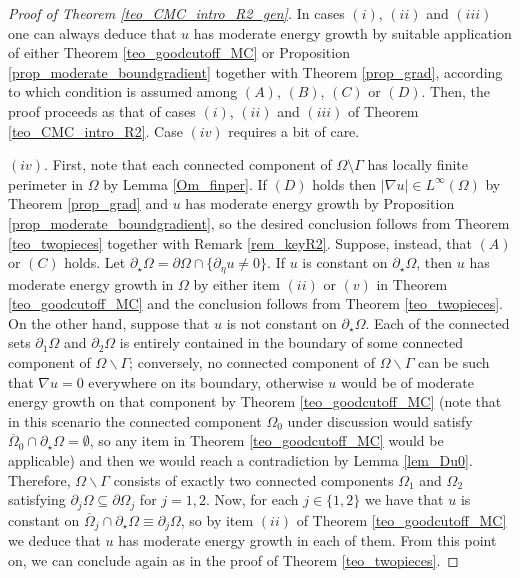 \documentclass[10 pt,a4paper]{article}
\theoremstyle{definition}
\begin{document}
\begin{proof}[Proof of Theorem \ref{teo_CMC_intro_R2_gen}]
	In cases $(i)$, $(ii)$ and $(iii)$ one can always deduce that $u$ has moderate energy growth by suitable application of either Theorem \ref{teo_goodcutoff_MC} or Proposition \ref{prop_moderate_boundgradient} together with Theorem \ref{prop_grad}, according to which condition is assumed among $(A)$, $(B)$, $(C)$ or $(D)$. Then, the proof proceeds as that of cases $(i)$, $(ii)$ and $(iii)$ of Theorem \ref{teo_CMC_intro_R2}. Case $(iv)$ requires a bit of care.
	
	$(iv)$. First, note that each connected component of $\Omega\setminus\Gamma$ has locally finite perimeter in $\Omega$ by Lemma \ref{Om_finper}. If $(D)$ holds then $|\nabla u|\in L^\infty(\Omega)$ by Theorem \eqref{prop_grad} and $u$ has moderate energy growth by Proposition \ref{prop_moderate_boundgradient}, so the desired conclusion follows from Theorem \ref{teo_twopieces} together with Remark \ref{rem_keyR2}. Suppose, instead, that $(A)$ or $(C)$ holds. Let $\partial_\star \Omega = \partial\Omega \cap \{\partial_\eta u \neq 0\}$. If $u$ is constant on $\partial_\star\Omega$, then $u$ has moderate energy growth in $\Omega$ by either item $(ii)$ or $(v)$ in Theorem \ref{teo_goodcutoff_MC} and the conclusion follows from Theorem \ref{teo_twopieces}. On the other hand, suppose that $u$ is not constant on $\partial_\star \Omega$. Each of the connected sets $\partial_1\Omega$ and $\partial_2\Omega$ is entirely contained in the boundary of some connected component of $\Omega\backslash\Gamma$; conversely, no connected component of $\Omega\backslash\Gamma$ can be such that $\nabla u = 0$ everywhere on its boundary, otherwise $u$ would be of moderate energy growth on that component by Theorem \ref{teo_goodcutoff_MC} (note that in this scenario the connected component $\Omega_0$ under discussion would satisfy $\overline{\Omega}_0 \cap \partial_\star\Omega = \emptyset$, so any item in Theorem \ref{teo_goodcutoff_MC} would be applicable) and then we would reach a contradiction by Lemma \ref{lem_Du0}. Therefore, $\Omega\backslash\Gamma$ consists of exactly two connected components $\Omega_1$ and $\Omega_2$ satisfying $\partial_j\Omega \subseteq \partial\Omega_j$ for $j=1,2$. Now, for each $j\in\{1,2\}$ we have that $u$ is constant on $\overline{\Omega}_j \cap \partial_\star\Omega \equiv \partial_j\Omega$, so by item $(ii)$ of Theorem \ref{teo_goodcutoff_MC} we deduce that $u$ has moderate energy growth in each of them. From this point on, we can conclude again as in the proof of Theorem \ref{teo_twopieces}.
	

\end{proof}
\end{document}
